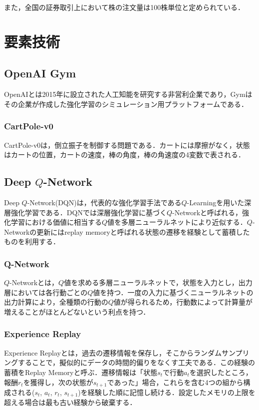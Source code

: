 \documentclass[twocolumn]{jarticle}
\begin{document}
    また，全国の証券取引上において株の注文量は100株単位と定められている．
\section{要素技術}
    \subsection{OpenAI Gym}
    OpenAIとは2015年に設立された人工知能を研究する非営利企業であり，Gymはその企業が作成した強化学習のシミュレーション用プラットフォームである．
        \subsubsection{CartPole-v0}
        CartPole-v0は，倒立振子を制御する問題である．カートには摩擦がなく，状態はカートの位置，カートの速度，棒の角度，棒の角速度の4変数で表される．

    \subsection{Deep $Q$-Network}
    Deep $Q$-Network(DQN)は，代表的な強化学習手法である$Q$-Learningを用いた深層強化学習である．DQNでは深層強化学習に基づく$Q$-Networkと呼ばれる，強化学習における価値に相当する$Q$値を多層ニューラルネットにより近似する．$Q$-Networkの更新にはreplay memoryと呼ばれる状態の遷移を経験として蓄積したものを利用する．

        \subsubsection{Q-Network}
        $Q$-Networkとは，$Q$値を求める多層ニューラルネットで，状態を入力とし，出力層においては各行動ごとの$Q$値を持つ．一度の入力に基づくニューラルネットの出力計算により，全種類の行動の$Q$値が得られるため，行動数によって計算量が増えることがほとんどないという利点を持つ．

        \subsubsection{Experience Replay}
        Experience Replayとは，過去の遷移情報を保存し，そこからランダムサンプリングすることで，擬似的にデータの時間的偏りをなくす工夫である．この経験の蓄積をReplay Memoryと呼ぶ．遷移情報は「状態$s_t$で行動$a_t$を選択したところ，報酬$r_t$を獲得し，次の状態が$s_{t+1}$であった」場合，これらを含む4つの組から構成される($s_t$, $a_t$, $r_t$, $s_{t+1}$)を経験した順に記憶し続ける．設定したメモリの上限を超える場合は最も古い経験から破棄する．
\end{document}
